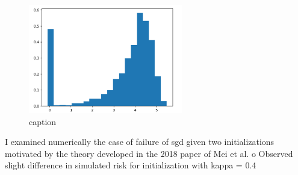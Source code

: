 \documentclass{article}
\begin{document}
\begin{figure}[H]
    \centering
    \includegraphics[width=0.6\textwidth]{images/Nguyen2018-SGD-2.png}
    \caption{ caption}
    \label{fig: label of figure}
\end{figure}

	I examined numerically the case of failure of sgd given two initializations motivated by the theory developed in the 2018 paper of Mei et al.
o	Observed slight difference in simulated risk for initialization with kappa = 0.4
 
\end{document}
